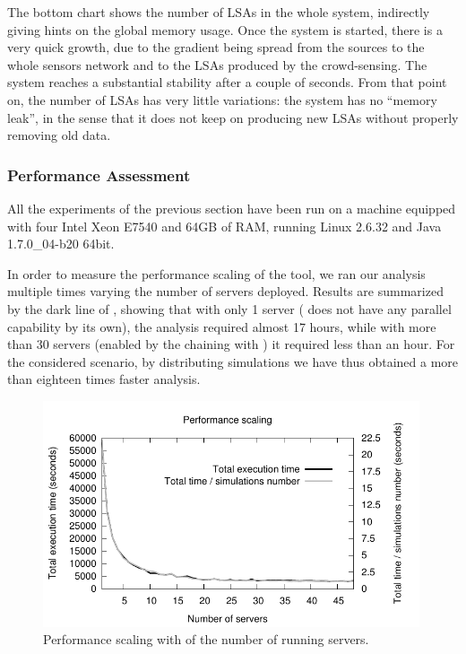 \documentclass[12pt,a4paper,twoside,openright]{book}
\begin{document}
The bottom chart shows the number of LSAs in the whole system, indirectly giving hints on the global memory usage.
%
Once the system is started, there is a very quick growth, due to the gradient being spread from the sources to the whole sensors network and to the LSAs produced by the crowd-sensing.
%
The system reaches a substantial stability after a couple of seconds.
%
From that point on, the number of LSAs has very little variations: the system has no ``memory leak'', in the sense that it does not keep on producing new LSAs without properly removing old data. 

\subsubsection{Performance Assessment}
All the experiments of the previous section have been run on a machine equipped with four Intel\textregistered{} Xeon\textregistered{} E7540 and 64GB of RAM, running Linux 2.6.32 and Java 1.7.0\_04-b20 64bit.

In order to measure the performance scaling of the tool, we ran our analysis multiple times varying the number of \multivesta{} servers deployed.
%
Results are summarized by the dark line of , showing that with only 1 server (\alchemist{} does not have any parallel capability by its own), the analysis required almost 17 hours, while with more than 30 servers (enabled by the chaining with \multivesta{}) it required less than an hour. For the considered scenario, by distributing simulations we have thus obtained a more than eighteen times faster analysis.

\begin{figure}[t]
\begin{center}
\vspace{-0.2cm}
 \includegraphics[width=0.99\textwidth]{img/scaling}
 \end{center}
 \caption{Performance scaling with of the number of running servers.}
 \label{img:performance}
\end{figure}
\end{document}
